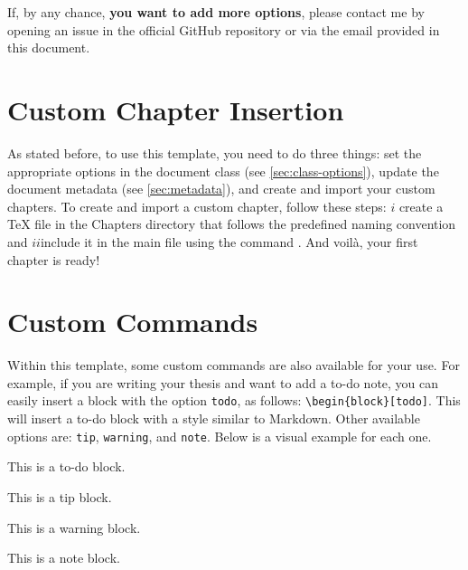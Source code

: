 If, by any chance, \textbf{you want to add more options}, please contact me by opening an issue in the official GitHub repository or via the email provided in this document.

\section{Custom Chapter Insertion}
As stated before, to use this template, you need to do three things: set the appropriate options in the document class (see \autoref{sec:class-options}), update the document metadata (see \autoref{sec:metadata}), and create and import your custom chapters. To create and import a custom chapter, follow these steps: \(i\) create a TeX file in the Chapters directory that follows the predefined naming convention and \(ii\)include it in the main file using the command \verb||. And voilà, your first chapter is ready!

\section{Custom Commands}
Within this template, some custom commands are also available for your use. For example, if you are writing your thesis and want to add a to-do note, you can easily insert a block with the option \verb|todo|, as follows: \verb|\begin{block}[todo]|. This will insert a to-do block with a style similar to Markdown. Other available options are: \verb|tip|, \verb|warning|, and \verb|note|. Below is a visual example for each one.

\vspace{.875em}
\begin{tcbraster}[
        raster columns=2,
        raster equal height,
        nobeforeafter,
        raster column skip=1cm
    ]
    \begin{block}[todo]
        This is a to-do block.
    \end{block}
    \begin{block}[tip]
        This is a tip block.
    \end{block}
\end{tcbraster}

\begin{tcbraster}[
        raster columns=2,
        raster equal height,
        nobeforeafter,
        raster column skip=1cm
    ]
    \begin{block}[warning]
        This is a warning block.
    \end{block}
    \begin{block}[note]
        This is a note block.
    \end{block}
\end{tcbraster}
\vspace{.875em}
